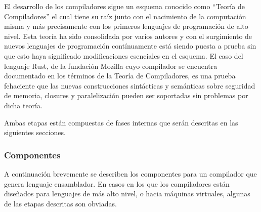 El desarrollo de los compiladores sigue un esquema conocido como “Teoría de Compiladores” el cual tiene su raíz junto con el nacimiento de la computación misma y más precisamente con los primeros lenguajes de programación de alto nivel. Esta teoría ha sido consolidada por varios autores\cite{aho1990compiladores}\cite{srikant2002compiler}\cite{slonneger1995formal}\cite{aho1990compiladores}\cite{meduna2007elements}\cite{appel2004modern}\cite{morgan1998building}\cite{terry1997compilers}\cite{grune2012modern}\cite{tremblay1985theory}\cite{lee1974anatomy}\cite{cooper2011engineering}\cite{gupta2010compiler}\cite{reps2007program}\cite{mak2011writing}\cite{midkiff2012automatic}\cite{seidl2012compiler}\cite{srikant2002compiler}\cite{su2011principles}\cite{mogensen2017introduction} y con el surgimiento de nuevos lenguajes de programación\cite{dasnois2011haxe}\cite{mccurdy2015haxe}\cite{klabnik2018rust}\cite{matzinger2019hands}\cite{sharma2019mastering}\cite{donovan2015go}\cite{summerfield2012programming}\cite{guney2018hands}\cite{skeen2018kotlin}\cite{adelekan2018kotlin}\cite{yousefkotlin} contínuamente está siendo puesta a prueba sin que esto haya significado modificaciones esenciales en el esquema. El caso del lenguaje Rust, de la fundación Mozilla\cite{mozillarustdoc} cuyo compilador se encuentra documentado\cite{mozillarustcdoc} en los términos de la Teoría de Compiladores, es una prueba fehaciente que las nuevas construcciones sintácticas y semánticas sobre seguridad de memoria, closures y paralelización pueden ser soportadas sin problemas por dicha teoría.

Ambas etapas están compuestas de fases internas que serán descritas en las siguientes secciones.

\subsubsection{Componentes}
A continuación brevemente se describen los componentes para un compilador que genera lenguaje ensamblador. En casos en los que los compiladores están diseñados para lenguajes de más alto nivel, o hacia máquinas virtuales, algunas de las etapas descritas son obviadas.

